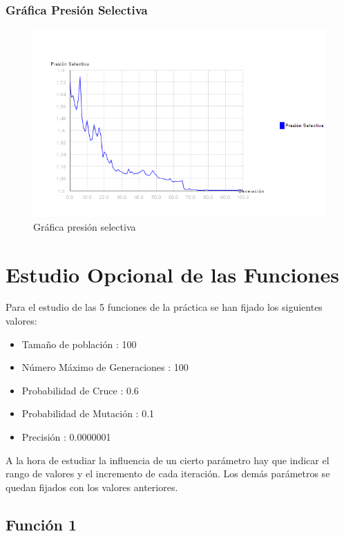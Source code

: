 \documentclass[12pt]{article}
\begin{document}
\subsubsection*{Gráfica Presión Selectiva}
\begin{figure}[H]
\centering
\includegraphics[scale=0.5]{graficas/F5inicial_presion}
\caption{Gráfica presión selectiva}
\label{fig}
\end{figure}
\newpage

\section{Estudio Opcional de las Funciones}	
	Para el estudio de las 5 funciones de la práctica se han fijado los siguientes valores:
	\begin{itemize}
		\item Tamaño de población : 100
		\item Número Máximo de Generaciones : 100
		\item Probabilidad de Cruce : 0.6
		\item Probabilidad de Mutación : 0.1
		\item Precisión : 0.0000001
	\end{itemize}
	A la hora de estudiar la influencia de un cierto parámetro hay que indicar el rango de valores y el incremento de cada iteración. Los demás parámetros se quedan fijados con los valores anteriores.
\subsection{Función 1}
\end{document}

